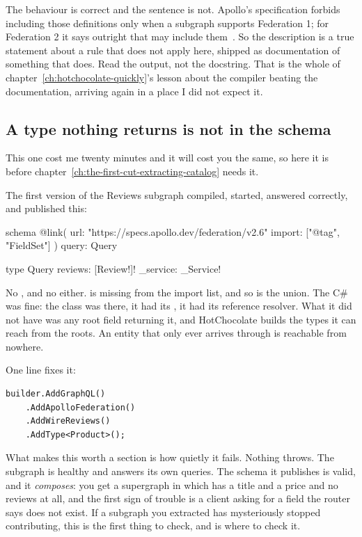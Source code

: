 The behaviour is correct and the sentence is not. Apollo's specification
forbids including those definitions only when a subgraph supports Federation 1;
for Federation 2 it says outright that  may include
them~\autocite{apollo2026subgraphspec}. So the description is a true statement
about a rule that does not apply here, shipped as documentation of something
that does. Read the output, not the docstring. That is the whole of
chapter~\ref{ch:hotchocolate-quickly}'s lesson about the compiler beating the
documentation, arriving again in a place I did not expect it.

\subsection*{A type nothing returns is not in the schema}

%
This one cost me twenty minutes and it will cost you the same, so here it is
before chapter~\ref{ch:the-first-cut-extracting-catalog} needs it.

The first version of the Reviews subgraph compiled, started, answered
 correctly, and published this:

\begin{graphqlsdl}
schema
  @link(
    url: "https://specs.apollo.dev/federation/v2.6"
    import: ["@tag", "FieldSet"]
  ) {
  query: Query
}

type Query {
  reviews: [Review!]!
  _service: _Service!
}
\end{graphqlsdl}

No , and no  either.  is missing from
the import list, and so is the  union. The C\# was fine: the
class was there, it had its \code{[Key("id")]}, it had its reference resolver.
What it did not have was any root field returning it, and HotChocolate builds
the types it can reach from the roots. An entity that only ever arrives through
 is reachable from nowhere.

One line fixes it:

\begin{verbatim}
builder.AddGraphQL()
    .AddApolloFederation()
    .AddWireReviews()
    .AddType<Product>();
\end{verbatim}

What makes this worth a section is how quietly it fails. Nothing throws. The
subgraph is healthy and answers its own queries. The schema it publishes is
valid, and it \emph{composes}: you get a supergraph in which  has
a title and a price and no reviews at all, and the first sign of trouble is a
client asking for a field the router says does not exist. If a subgraph you
extracted has mysteriously stopped contributing, this is the first thing to
check, and  is where to check it.

%
